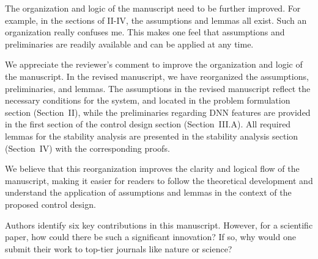 \documentclass[12pt,english]{reviewresponse}
\providecommand{\DIFaddtex}[1]{{\protect\color{blue}\uwave{#1}}} %
\providecommand{\DIFaddbegin}{} %
\providecommand{\DIFaddend}{} %
\providecommand{\DIFadd}[1]{\texorpdfstring{\DIFaddtex{#1}}{#1}} %
\providecommand{\DIFaddincludegraphics}[2][]{{\color{blue}\fbox{\DIFOincludegraphics[#1]{#2}}}} %
\DeclareRobustCommand{\DIFaddbegin}{\DIFOaddbegin \let\includegraphics\DIFaddincludegraphics} %
\DeclareRobustCommand{\DIFaddend}{\DIFOaddend \let\includegraphics\DIFOincludegraphics} %
\begin{document}
% 
\begin{revcomment}[3][1]{}
	The organization and logic of the manuscript need to be further improved. For example, in the sections of II-IV, the assumptions and lemmas all exist. Such an organization really confuses me. This makes one feel that assumptions and preliminaries are readily available and can be applied at any time.
\end{revcomment}

\begin{revresponse}
	We appreciate the reviewer's comment to improve the organization and logic of the manuscript.
  In the revised manuscript, we have reorganized the assumptions, preliminaries, and lemmas.
  The assumptions in the revised manuscript reflect the necessary conditions for the system, and located in the problem formulation section (Section~II), while the preliminaries regarding \DIFaddbegin \DIFadd{control design and }\DIFaddend DNN features are provided in the first section of the control design section (Section~III.A).
  All required lemmas for the stability analysis are presented in the stability analysis section (Section~IV) with the corresponding proofs.

  We believe that this reorganization improves the clarity and logical flow of the manuscript, making it easier for readers to follow the theoretical development and understand the application of assumptions and lemmas in the context of the proposed control design.
\end{revresponse}

% 
\begin{revcomment}[3][1]{}
	Authors identify six key contributions in this manuscript. However, for a scientific paper, how could there be such a significant innovation? If so, why would one submit their work to top-tier journals like nature or science?
\end{revcomment}
\end{document}
